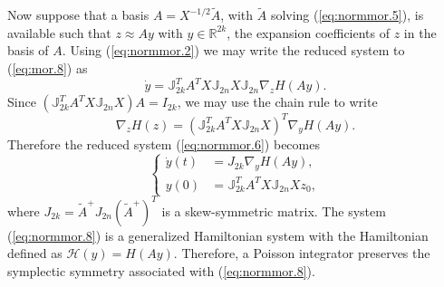 Now suppose that a basis $A=X^{-1/2}\tilde A$, with $\tilde A$ solving (\ref{eq:normmor.5}), is available such that $z \approx Ay$ with $y\in \mathbb R^{2k}$, the expansion coefficients of $z$ in the basis of $A$. Using (\ref{eq:normmor.2}) we may write the reduced system to (\ref{eq:mor.8}) as
\begin{equation} \label{eq:normmor.6}
	\dot y = \mathbb J_{2k}^T A^T X \mathbb J_{2n} X \mathbb{J}_{2n} \nabla_z H(Ay).
\end{equation}
Since $(\mathbb J_{2k}^T A^T X \mathbb J_{2n} X) A = I_{2k}$, we may use the chain rule to write
\begin{equation} \label{eq:normmor.7}
	\nabla_z H(z) = ( \mathbb J_{2k}^T A^T X \mathbb J_{2n} X )^T \nabla_y H(Ay).
\end{equation}
%
%
Therefore the reduced system (\ref{eq:normmor.6}) becomes
\begin{equation} \label{eq:normmor.8}
\left\{
\begin{aligned}
	\dot y(t) &= J_{2k} \nabla_y H(Ay), \\
	y(0) &= \mathbb J_{2k}^T A^T X \mathbb J_{2n} X z_0,
\end{aligned}
\right.
\end{equation}
where $J_{2k}=\tilde A^+ J_{2n} (\tilde A^+)^T$ is a skew-symmetric matrix. The system (\ref{eq:normmor.8}) is a generalized Hamiltonian system with the Hamiltonian defined as $\mathcal H(y) = H(Ay)$. Therefore, a Poisson integrator preserves the symplectic symmetry associated with (\ref{eq:normmor.8}).

